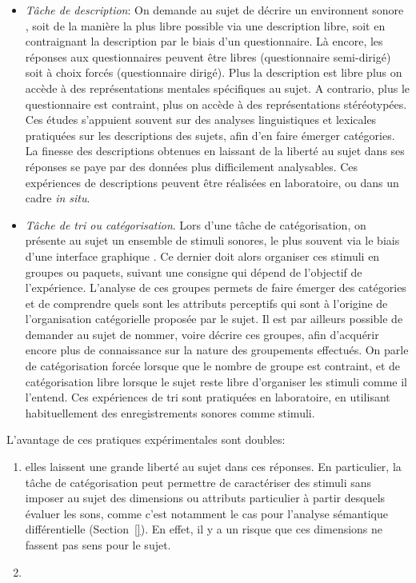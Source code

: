 \begin{itemize}
\item \emph{Tâche de description}: On demande au sujet de décrire un environnent sonore \citep{axelsson2005soundscape,raimbault2005urban,guastavino2006ideal,raimbault2006qualitative}, soit de la manière la plus libre possible via une description libre, soit en contraignant la description par le biais d'un questionnaire. Là encore, les réponses aux questionnaires peuvent être libres (questionnaire semi-dirigé) soit à choix forcés (questionnaire dirigé). Plus la description est libre plus on accède à des représentations mentales spécifiques au sujet. A contrario, plus le questionnaire est contraint, plus on accède à des représentations stéréotypées. Ces études s'appuient souvent sur des analyses linguistiques et lexicales pratiquées sur les descriptions des sujets, afin d'en faire émerger catégories. La finesse des descriptions obtenues en laissant de la liberté au sujet dans ses réponses se paye par des données plus difficilement analysables. Ces expériences de descriptions peuvent être réalisées en laboratoire, ou dans un cadre \emph{in situ}.
\item \emph{Tâche de tri ou catégorisation}. Lors d'une tâche de catégorisation, on présente au sujet un ensemble de stimuli sonores, le plus souvent via le biais d'une interface graphique \citep{maffiolo_caracterisation_1999,guastavino2007categorization}. Ce dernier doit alors organiser ces stimuli en groupes ou paquets, suivant une consigne qui dépend de l'objectif de l’expérience. L'analyse de ces groupes permets de faire émerger des catégories et de comprendre quels sont les attributs perceptifs qui sont à l'origine de l'organisation catégorielle proposée par le sujet. Il est par ailleurs possible de demander au sujet de nommer, voire décrire ces groupes, afin d'acquérir encore plus de connaissance sur la nature des groupements effectués. On parle de catégorisation forcée lorsque que le nombre de groupe est contraint, et de catégorisation libre lorsque le sujet reste libre d'organiser les stimuli comme il l'entend. Ces expériences de tri sont pratiquées en laboratoire, en utilisant habituellement des enregistrements sonores comme stimuli.
\end{itemize}

L'avantage de ces pratiques expérimentales sont doubles:

\begin{enumerate}
\item  elles laissent une grande liberté au sujet dans ces réponses. En particulier, la tâche de catégorisation peut permettre de caractériser des stimuli sans imposer au sujet des dimensions ou attributs particulier à partir desquels évaluer les sons, comme c'est notamment le cas pour l'analyse sémantique différentielle (\Cf Section~\ref{}). En effet, il y a un risque que ces dimensions ne fassent pas sens pour le sujet. 
\item {}
\end{enumerate}

